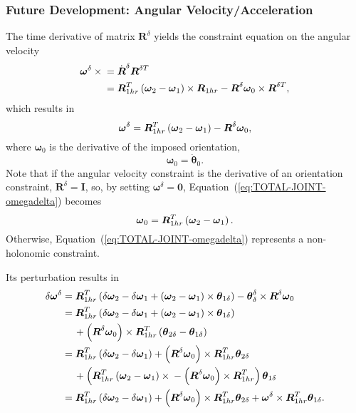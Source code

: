 \documentclass[10pt,dvips,fleqn]{report}
\newcommand{\T}[1]{\boldsymbol{#1}}
\begin{document}
\subsubsection{Future Development: Angular Velocity/Acceleration}
The time derivative of matrix $\T{R}^{\delta}$ yields
the constraint equation on the angular velocity
\begin{align}
	\T{\omega}^{\delta}\times{}
	&= \dot{\T{R}}^{\delta} \T{R}^{\delta T} \nonumber \\
	&= \T{R}_{1hr}^T \plbr{
		\T{\omega}_2 - \T{\omega}_1
	} \times \T{R}_{1hr}
	- \T{R}^{\delta} \T{\omega}_0 \times \T{R}^{\delta T},
\end{align}
which results in
\begin{equation}
	\T{\omega}^{\delta} = \T{R}_{1hr}^T \plbr{
		\T{\omega}_2 - \T{\omega}_1
	} - \T{R}^{\delta} \T{\omega}_0 ,
	\label{eq:TOTAL-JOINT-omegadelta}
\end{equation}
where $\T{\omega}_0$ is the derivative of the imposed orientation,
\begin{equation}
	\T{\omega}_0 = \dot{\T{\theta}}_0 .
\end{equation}
Note that if the angular velocity constraint 
is the derivative of an orientation constraint, $\T{R}^{\delta}=\T{I}$,
so, by setting $\T{\omega}^{\delta}=\T{0}$,
Equation~(\ref{eq:TOTAL-JOINT-omegadelta}) becomes
\begin{equation}
	\T{\omega}_0 = \T{R}_{1hr}^T \plbr{
		\T{\omega}_2 - \T{\omega}_1
	} .
	\label{eq:TOTAL-JOINT-omega_0}
\end{equation}
Otherwise, Equation~(\ref{eq:TOTAL-JOINT-omegadelta}) represents
a non-holonomic constraint.

Its perturbation results in
\begin{align}
	\delta\T{\omega}^{\delta}
	&= \T{R}_{1hr}^T \plbr{
		\delta\T{\omega}_2
		- \delta\T{\omega}_1
		+ \plbr{\T{\omega}_2 - \T{\omega}_1}\times\T{\theta}_{1\delta}
	} - \T{\theta}_{\delta}^{\delta}\times\T{R}^{\delta}\T{\omega}_0 \nonumber \\
	&= \T{R}_{1hr}^T \plbr{
		\delta\T{\omega}_2
		- \delta\T{\omega}_1
		+ \plbr{\T{\omega}_2 - \T{\omega}_1}\times\T{\theta}_{1\delta}
	} \nonumber \\
	& \mbox{\hspace{12pt}}
	+ \plbr{\T{R}^{\delta}\T{\omega}_0}\times \T{R}_{1hr}^T \plbr{
		\T{\theta}_{2\delta}
		- \T{\theta}_{1\delta}
	} \nonumber \\
	&= \T{R}_{1hr}^T \plbr{
		\delta\T{\omega}_2
		- \delta\T{\omega}_1
	} + \plbr{\T{R}^{\delta}\T{\omega}_0}\times \T{R}_{1hr}^T \T{\theta}_{2\delta}
	\nonumber \\
	& \mbox{\hspace{12pt}}
	+ \plbr{
		\T{R}_{1hr}^T \plbr{\T{\omega}_2 - \T{\omega}_1}\times{}
		- \plbr{\T{R}^{\delta}\T{\omega}_0}\times \T{R}_{1hr}^T
	} \T{\theta}_{1\delta}
	\nonumber \\
	&= \T{R}_{1hr}^T \plbr{
		\delta\T{\omega}_2
		- \delta\T{\omega}_1
	} + \plbr{\T{R}^{\delta}\T{\omega}_0}\times \T{R}_{1hr}^T \T{\theta}_{2\delta}
	+ \T{\omega}^{\delta} \times \T{R}_{1hr}^T \T{\theta}_{1\delta} .
\end{align}
\end{document}

